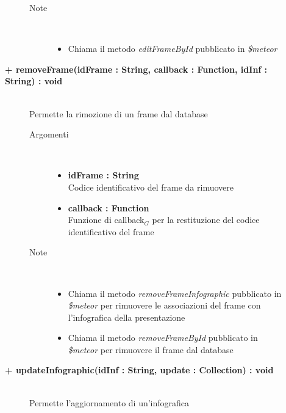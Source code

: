 \begin{description}
\begin{description}
\begin{description}
\begin{itemize}
				\end{itemize}
			\item[Note] \hfill \\
			\begin{itemize}
					\item Chiama il metodo \textit{editFrameById} pubblicato in \textit{\$meteor}
			\end{itemize}
		\end{description}
	\end{description}
	
	\begin{description}
		\item[\textbf{\color{blue}+ removeFrame(idFrame : String, callback : Function, idInf : String) : void			}] \hfill \\
			Permette la rimozione di un frame dal database
			
		\begin{description}
			\item[Argomenti] \hfill \\
				\begin{itemize}
					\item \textbf{idFrame : String			} \hfill \\
					Codice identificativo del frame da rimuovere
					\item \textbf{callback : Function			} \hfill \\
					Funzione di callback$_G$ per la restituzione del codice identificativo del frame
					
				\end{itemize}
			\item[Note] \hfill \\
			\begin{itemize}
					\item Chiama il metodo \textit{removeFrameInfographic} pubblicato in \textit{\$meteor} per rimuovere le associazioni del frame con l'infografica della presentazione
					\item Chiama il metodo \textit{removeFrameById} pubblicato in \textit{\$meteor} per rimuovere il frame dal database
			\end{itemize}
		\end{description}
	\end{description}
	
	\begin{description}
		\item[\textbf{\color{blue}+ updateInfographic(idInf : String, update : Collection) : void			}] \hfill \\
			Permette l'aggiornamento di un'infografica
			

\end{description}
\end{description}

